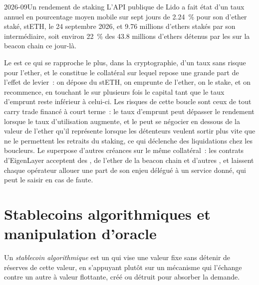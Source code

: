 \begin{dated}{2026-09}{Un rendement de staking}\label{dat:m3:defi-credit-and-leverage:lido}
L'API publique de Lido a fait état d'un taux annuel en pourcentage moyen mobile sur sept jours de 2.24~\% pour son  d'ether staké, stETH, le 24 septembre 2026,
et 9.76 millions d'ethers stakés par son intermédiaire, soit environ 22~\% des 43.8 millions d'ethers détenus par les  sur la beacon chain ce jour-là.
\end{dated}

Le  est ce qui se rapproche le plus, dans la cryptographie, d'un taux sans risque pour l'ether, et le  constitue le collatéral sur lequel
repose une grande part de l'effet de levier~: on dépose du stETH, on emprunte de l'ether, on le stake, et on recommence, en touchant le  sur plusieurs fois le capital tant que le taux d'emprunt
reste inférieur à celui-ci. Les risques de cette boucle sont ceux de tout carry trade financé à court terme~: le taux d'emprunt peut dépasser le rendement lorsque le taux d'utilisation augmente,
et le  peut se négocier en dessous de la valeur de l'ether qu'il représente lorsque les détenteurs veulent sortir plus vite que ne le permettent les retraits du staking,
ce qui déclenche des liquidations chez les boucleurs. Le  superpose d'autres créances sur le même collatéral~: les contrats d'EigenLayer acceptent des ,
de l'ether de la beacon chain et d'autres , et laissent chaque opérateur allouer une part de son enjeu délégué à un service donné, qui peut le saisir en cas de faute.

\section{Stablecoins algorithmiques et manipulation d'oracle}

\begin{definition}\label{def:m3:defi-credit-and-leverage:algo}
Un \emph{stablecoin algorithmique} est un  qui vise une valeur fixe sans détenir de réserves de cette valeur, en s'appuyant
plutôt sur un mécanisme qui l'échange contre un autre  à valeur flottante, créé ou détruit pour absorber la demande.
\end{definition}

